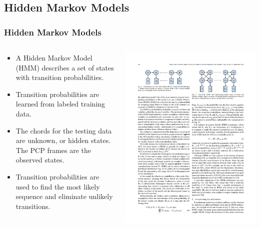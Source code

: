 \documentclass{beamer}
\begin{document}
\subsection{Hidden Markov Models}

\begin{frame}
	\frametitle{Hidden Markov Models}
	\begin{columns}
	\begin{column}{.6\textwidth}
		\begin{itemize}
			\item A Hidden Markov Model (HMM) describes a set of states with transition probabilities.
			\item Transition probabilities are learned from labeled training data.
			\item The chords for the testing data are unknown, or hidden states. The PCP frames are the observed states.
			\item Transition probabilities are used to find the most likely sequence and eliminate unlikely transitions.
		\end{itemize}
	\end{column}
	\begin{column}{.4\textwidth}
		\includegraphics[width=.95\textwidth]{hmm.pdf}
	\end{column}
	\end{columns}
\end{frame}
\end{document}
